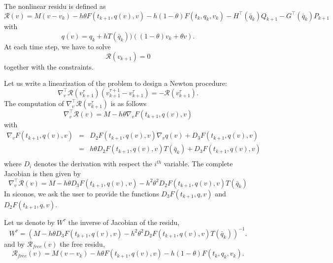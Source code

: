 The nonlinear residu is defined as
\begin{equation}
  \label{eq:Moreau--Jean-theta--nearly-residu}
  \mathcal R(v) =  M(v-v_k) - h  \theta F(t_{k+1}, q(v),v) - h (1- \theta) F(t_{k}, q_{k},v_{k}) - H^\top(\bar q_k) Q_{k+1} - G^\top(\bar q_k) P_{k+1}
\end{equation}
with
\begin{equation}
  \label{eq:Moreau--Jean-theta--nearly-residu1}
  q(v) = q_{k} + h T(\bar q_k)) ((1-\theta) v_k + \theta v).
\end{equation}
At each time step, we have to solve
\begin{equation}
  \label{eq:Moreau--Jean-theta--nearly-residu2}
  \mathcal R(v_{k+1}) =  0
\end{equation}
together with the constraints.

Let us write a linearization of the problem to design a Newton procedure:
\begin{equation}
  \label{eq:Moreau--Jean-theta--nearly-residu3}
  \nabla^\top_v \mathcal R(v^{\tau}_{k+1})(v^{\tau+1}_{k+1}-v^{\tau}_{k+1}) = -  \mathcal R(v^{\tau}_{k+1}).
\end{equation}
The computation of $ \nabla^\top_v \mathcal R(v^{\tau}_{k+1})$ is as follows
\begin{equation}
  \label{eq:102}
  \nabla^\top_v \mathcal R(v) = M - h \theta \nabla_v F(t_{k+1}, q(v),v)
\end{equation}
with
\begin{equation}
  \label{eq:103}
  \begin{array}{lcl}
    \nabla_v F(t_{k+1}, q(v),v) &=& D_2 F(t_{k+1}, q(v),v) \nabla_v q(v) + D_3 F(t_{k+1}, q(v),v) \\
                                &=& h \theta D_2 F(t_{k+1}, q(v),v) T(\bar q_k) + D_3 F(t_{k+1}, q(v),v) \\
  \end{array}
\end{equation}
where $D_i$ denotes the derivation with respect the $i^{th}$ variable. The complete Jacobian is then given by
\begin{equation}
  \label{eq:104}
  \nabla^\top_v \mathcal R(v) = M - h \theta D_3 F(t_{k+1}, q(v),v) - h^2 \theta^2 D_2 F(t_{k+1}, q(v),v) T(\bar q_k)
\end{equation}
In siconos, we ask the user to provide the functions $D_3 F(t_{k+1}, q ,v )$ and $D_2 F(t_{k+1}, q,v)$.

Let us denote by $W^{\tau}$ the inverse of  Jacobian of the residu,
\begin{equation}
  \label{eq:105}
  W^{\tau} = (M - h \theta D_3 F(t_{k+1}, q(v),v) - h^2 \theta^2 D_2 F(t_{k+1}, q(v),v) T(\bar q_k))^{-1}.
\end{equation}
and by $\mathcal R_{free}(v)$ the free residu,
\begin{equation}
  \label{eq:106}
  \mathcal R_{free}(v) =  M(v-v_k) - h  \theta F(t_{k+1}, q(v),v) - h (1- \theta) F(t_{k}, q_{k},v_{k}).
\end{equation}

